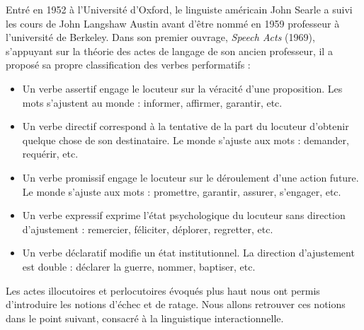 Entré en 1952 à l’Université d’Oxford, le linguiste américain John Searle a suivi les cours de John Langshaw Austin avant d’être nommé en 1959 professeur à l’université de Berkeley. Dans son premier ouvrage, \textit{Speech Acts} (1969), s’appuyant sur la théorie des actes de langage de son ancien professeur, il a proposé sa propre classification des verbes performatifs :
\begin{itemize}
\item Un verbe assertif engage le locuteur sur la véracité d’une proposition. Les mots s’ajustent au monde : informer, affirmer, garantir, etc.
\item Un verbe directif correspond à la tentative de la part du locuteur d’obtenir quelque chose de son destinataire. Le monde s’ajuste aux mots : demander, requérir, etc.
\item Un verbe promissif engage le locuteur sur le déroulement d’une action future. Le monde s’ajuste aux mots : promettre, garantir, assurer, s’engager, etc.
\end{itemize}
\begin{itemize}
\item Un verbe expressif exprime l’état psychologique du locuteur sans direction d’ajustement : remercier, féliciter, déplorer, regretter, etc.
\item Un verbe déclaratif modifie un état institutionnel. La direction d’ajustement est double : déclarer la guerre, nommer, baptiser, etc.
\end{itemize}
Les actes illocutoires et perlocutoires évoqués plus haut nous ont permis d’introduire les notions d’échec et de ratage. Nous allons retrouver ces notions dans le point suivant, consacré à la linguistique interactionnelle.

